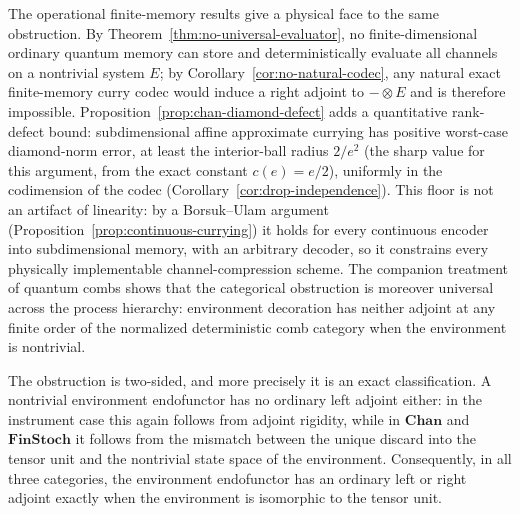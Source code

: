 \documentclass[11pt]{article}
\begin{document}
The operational finite-memory results give a physical face to the same
obstruction. By Theorem~\ref{thm:no-universal-evaluator}, no
finite-dimensional ordinary quantum memory can store and deterministically
evaluate all channels on a nontrivial system $E$; by
Corollary~\ref{cor:no-natural-codec}, any natural exact finite-memory curry
codec would induce a right adjoint to $-\otimes E$ and is therefore
impossible. Proposition~\ref{prop:chan-diamond-defect} adds a quantitative
rank-defect bound: subdimensional affine approximate currying has positive
worst-case diamond-norm error, at least the interior-ball radius $2/e^2$
(the sharp value for this argument, from the exact constant $c(e)=e/2$),
uniformly in the codimension of the codec
(Corollary~\ref{cor:drop-independence}). This floor is not an artifact of
linearity: by a Borsuk--Ulam argument
(Proposition~\ref{prop:continuous-currying}) it holds for every continuous
encoder into subdimensional memory, with an arbitrary decoder, so it constrains
every physically implementable channel-compression scheme. The companion
treatment of quantum combs \cite{Abaee-combs} shows that the categorical
obstruction is moreover universal across the process hierarchy: environment
decoration has neither adjoint at any finite order of the normalized
deterministic comb category when the environment is nontrivial.

The obstruction is two-sided, and more precisely it is an exact
classification. A nontrivial environment endofunctor has no ordinary left
adjoint either: in the instrument case this again follows from adjoint
rigidity, while in $\mathbf{Chan}$ and $\mathbf{FinStoch}$ it follows from
the mismatch between the unique discard into the tensor unit and the
nontrivial state space of the environment. Consequently, in all three
categories, the environment endofunctor has an ordinary left or right
adjoint exactly when the environment is isomorphic to the tensor unit.
\end{document}
